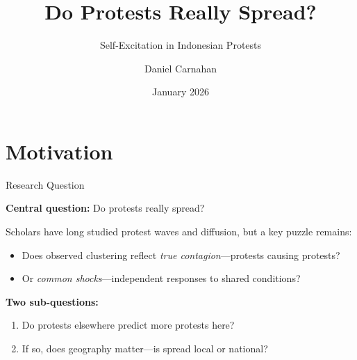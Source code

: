 \documentclass[aspectratio=169]{beamer}
\title{Do Protests Really Spread?}
\subtitle{Self-Excitation in Indonesian Protests}
\author{Daniel Carnahan}
\date{January 2026}
\institute{}
\begin{document}

\maketitle


\section{Motivation}

\begin{frame}{Research Question}

\textbf{Central question:} Do protests really spread?

\vspace{1em}

Scholars have long studied protest waves and diffusion, but a key puzzle remains:

\begin{itemize}
    \item Does observed clustering reflect \textit{true contagion}---protests causing protests?
    \item Or \textit{common shocks}---independent responses to shared conditions?
\end{itemize}

\vspace{1em}

\textbf{Two sub-questions:}

\begin{enumerate}
    \item Do protests elsewhere predict more protests here?
    \item If so, does geography matter---is spread local or national?
\end{enumerate}

\end{frame}
\end{document}
